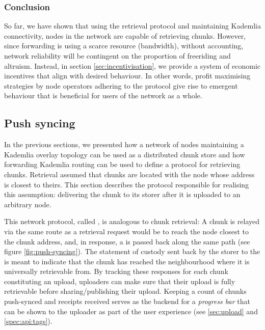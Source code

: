 \subsubsection{Conclusion}

So far, we have shown that using the retrieval protocol and maintaining Kademlia connectivity, nodes in the network are capable of retrieving chunks. However, since forwarding is using a scarce resource (bandwidth), without accounting, network reliability will be contingent on the proportion of freeriding and altruism. Instead, in section \ref{sec:incentivisation}, we provide a system of economic incentives that align with desired behaviour. In other words, profit maximising strategies by node operators adhering to the protocol give rise to emergent behaviour that is beneficial for users of the network as a whole.
 
\subsection{Push syncing}\label{sec:push-syncing}
 
In the previous sections, we presented how a network of nodes maintaining a Kademlia overlay topology can be used as a distributed chunk store and how forwarding Kademlia routing can be used to define a  protocol for retrieving chunks.
Retrieval assumed that chunks are located with the node whose address is closest to theirs. This section describes the protocol responsible for realising this assumption: delivering the chunk to its storer after it is uploaded to an arbitrary node.

This network protocol, called , is analogous to chunk retrieval: A chunk is relayed via the same route as a retrieval request would be to reach the node closest to the chunk address, and, in response, a  is passed back along the same path (see figure \ref{fig:push-syncing}). The statement of custody sent back by the storer to the  is meant to indicate that the chunk has reached the neighbourhood where it is universally retrievable from. By tracking these responses for each chunk constituting an upload, uploaders can make sure that their upload is fully retrievable before sharing/publishing their upload. Keeping a count of chunks push-synced and receipts received serves as the backend for a \emph{progress bar} that can be shown to the uploader as part of the user experience (see \ref{sec:upload} and \ref{spec:api:tags}).


